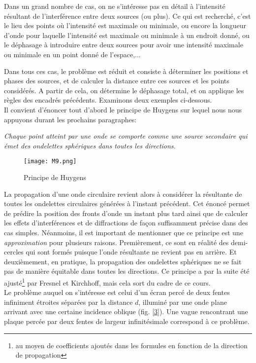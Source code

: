 Dans un grand nombre de cas, on ne s'intéresse pas en détail à l'intensité résultant de l'interférence entre deux sources (ou plus). Ce qui est recherché, c'est le lieu des points où l'intensité est maximale ou minimale, ou encore la longueur d'onde pour laquelle l'intensité est maximale ou minimale à un endroit donné, ou le déphasage à introduire entre deux sources pour avoir une intensité maximale ou minimale en un point donné de l'espace,...

Dans tous ces cas, le problème est réduit et consiste à déterminer les positions et phases des sources, et de calculer la distance entre ces sources et les points considérés. A partir de cela, on détermine le déphasage total, et on applique les règles des encadrés précédents. Examinons deux exemples ci-dessous.\\

Il convient d'énoncer tout d'abord le principe de Huygens sur lequel nous nous appuyons durant les prochains paragraphes:
\begin{center}
\textit{Chaque point atteint par une onde se comporte comme une source secondaire qui émet des ondelettes sphériques dans toutes les directions.}
\end{center}

\begin{figure}[htb]
\centering
\texttt{[image: M9.png]}
\caption{Principe de Huygens}
\end{figure}

La propagation d'une onde circulaire revient alors à considérer la résultante de toutes les ondelettes circulaires générées à l'instant précédent.
Cet énoncé permet de prédire la position des fronts d’onde un instant plus tard ainsi que de calculer les effets d’interférences et de diffractions de façon suffisamment précise dans des cas simples.
Néanmoins, il est important de mentionner que ce principe est une {\it approximation} pour plusieurs raisons. Premièrement, ce sont en réalité des demi-cercles qui sont formés puisque l'onde résultante ne revient pas en arrière. Et deuxièmement, en pratique, la propagation des ondelettes sphériques ne se fait pas de manière équitable dans toutes les directions. Ce principe a par la suite été ajusté\footnote{au moyen de coefficients ajoutés dans les formules en fonction de la direction de propagation} par Fresnel et Kirchhoff, mais cela sort du cadre de ce cours.\\

Le problème auquel on s'intéresse est celui d'un écran percé de deux fentes infiniment étroites séparées par la distance $d$, illuminé par une onde plane arrivant avec une certaine incidence oblique (fig. \ref{3}). Une vague rencontrant une plaque percée par deux fentes de largeur infinitésimale correspond à ce problème.

